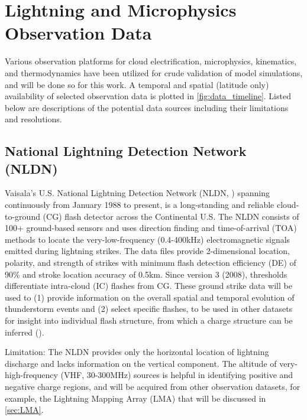  
\chapter{Lightning and Microphysics Observation Data}
\resetfootnote %
Various observation platforms for cloud electrification, microphysics, kinematics, and thermodynamics have been utilized for crude validation of model simulations, and will be done so for this work. A temporal and spatial (latitude only) availability of selected observation data is plotted in \ref{fig:data_timeline}. Listed below are descriptions of the potential data sources including their limitations and resolutions.
\section{National Lightning Detection Network (NLDN)}
Vaisala’s U.S. National Lightning Detection Network (NLDN, \cite{cummins2009overview}) spanning continuously from January 1988 to present, is a long-standing and reliable cloud-to-ground (CG)  flash  detector  across  the  Continental  U.S.  The NLDN  consists  of  100+  ground-based  sensors and uses direction finding and time-of-arrival (TOA) methods to locate the very-low-frequency (0.4-400kHz) electromagnetic signals emitted during lightning strikes. The data files provide 2-dimensional location, polarity, and strength of strikes with minimum flash detection efficiency (DE) of 90\% and stroke location accuracy of 0.5km. Since version 3 (2008), thresholds differentiate intra-cloud (IC) flashes from CG. These ground strike data will be used to (1) provide information on the overall spatial and temporal evolution of thunderstorm events and (2) select specific flashes, to be used in other datasets for insight into individual flash structure, from which a charge structure can be inferred (\cite{mazur1997initial, thomas2001observations}).

Limitation: The NLDN provides only the horizontal location of lightning discharge and lacks information on the vertical component. The altitude of very-high-frequency (VHF, 30-300MHz) sources is helpful in identifying positive and negative charge regions, and will be acquired from other observation datasets, for example, the Lightning Mapping Array (LMA) that will be discussed in \ref{sec:LMA}. 

